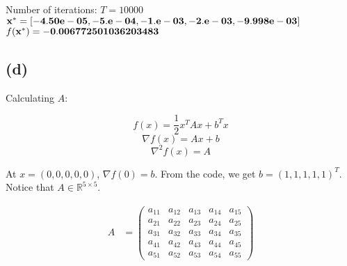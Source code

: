 \documentclass{article}
\begin{document}
\begin{center}
    Number of iterations: $T = 10000$ \\
    $\bf{x^*} = [-4.50e-05, -5.e-04, -1.e-03, -2.e-03, -9.998e-03]$ \\
    $f(\bf{x^*}) = -0.006772501036203483$
\end{center}

\subsection*{(d)}

Calculating $A$:

$$f(x) = \frac{1}{2}x^TAx + b^Tx$$
$$\nabla f(x) = Ax + b$$
$$\nabla^2 f(x) = A$$

At $x = (0, 0, 0, 0, 0)$, $\nabla f(0) = b$. From the code, we get $b = (1, 1, 1, 1, 1)^T$. Notice that $A \in \mathbb{R}^{5 \times 5}$.

\begin{align*}
    A &= \begin{pmatrix}
        a_{11} & a_{12} & a_{13} & a_{14} & a_{15} \\
        a_{21} & a_{22} & a_{23} & a_{24} & a_{25} \\
        a_{31} & a_{32} & a_{33} & a_{34} & a_{35} \\
        a_{41} & a_{42} & a_{43} & a_{44} & a_{45} \\
        a_{51} & a_{52} & a_{53} & a_{54} & a_{55}
    \end{pmatrix}
\end{align*}
\end{document}
